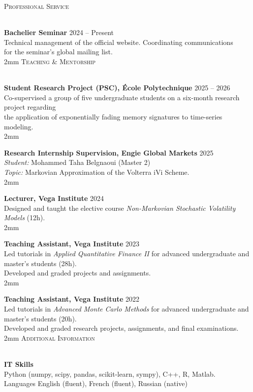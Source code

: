 \documentclass[11pt]{article}
\newcommand{\lineunder}{\vspace*{-8pt} \\ \hspace*{-18pt} \hrulefill \\}
\newcommand{\header}[1]{{\hspace*{-15pt}\vspace*{6pt} \textsc{#1}} \vspace*{-6pt} \lineunder}
\newcommand{\schoolwithcourses}[4]{
 \textbf{#1} \hfill{#2}\\
    #3\\
\vspace*{5pt}
}
\begin{document}
\vspace{2mm}
\header{Professional Service}

\vspace{2mm}
\schoolwithcourses{Bachelier Seminar}{2024 -- Present}
{Technical management of the official website. Coordinating communications \\ for the seminar's global mailing list.}

\vspace{2mm}
\header{Teaching \& Mentorship}

\vspace{2mm}
\schoolwithcourses{Student Research Project (PSC), École Polytechnique}{2025 -- 2026}
{Co-supervised a group of five undergraduate students on a six-month research project regarding \\ the application of exponentially fading memory signatures to time-series modeling.}

\vspace{2mm}
\schoolwithcourses{Research Internship Supervision, Engie Global Markets}{2025}
{\textit{Student:} Mohammed Taha Belgnaoui (Master 2) \\
\textit{Topic:} Markovian Approximation of the Volterra iVi Scheme.}

\vspace{2mm}
\schoolwithcourses{Lecturer, Vega Institute}{2024}
{Designed and taught the elective course \textit{Non-Markovian Stochastic Volatility Models} (12h).}

\vspace{2mm}
\schoolwithcourses{Teaching Assistant, Vega Institute}{2023}
{Led tutorials in \textit{Applied Quantitative Finance II} for advanced undergraduate and master’s students (28h). \\ Developed and graded projects and assignments.}

\vspace{2mm}
\schoolwithcourses{Teaching Assistant, Vega Institute}{2022}
{Led tutorials in \textit{Advanced Monte Carlo Methods} for advanced undergraduate and master’s students (20h). \\ Developed and graded research projects, assignments, and final examinations.}

\vspace{2mm}
\header{Additional Information}

\vspace{2mm}
\schoolwithcourses{IT Skills}{}
{Python (numpy, scipy, pandas, scikit-learn, sympy), C++, R, Matlab.}

\schoolwithcourses{Languages}{}
{English (fluent), French (fluent), Russian (native)}
\end{document}
